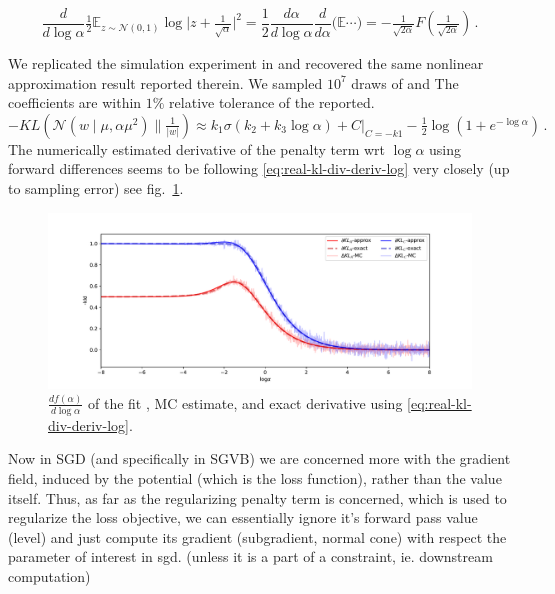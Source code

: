 \documentclass[a4paper,10pt]{article}
\begin{document}
\begin{equation} \label{eq:real-kl-div-deriv-log}
  \frac{d}{d\log \alpha}
    \tfrac12 \mathbb{E}_{z \sim \mathcal{N}(0,1)}
    \log \lvert z + \tfrac1{\sqrt{\alpha}} \rvert^2
    = \frac12 \frac{d\alpha}{d\log \alpha}
      \frac{d}{d\alpha} \bigl(\mathbb{E}\cdots \bigr)
    = - \tfrac1{\sqrt{2\alpha}} F(\tfrac1{\sqrt{2\alpha}})
    \,.
\end{equation}

We replicated the simulation experiment in \cite{molchanov_variational_2017} and recovered
the same nonlinear approximation result reported therein. We sampled $10^7$ draws of  and 
The coefficients are within
$1\%$ relative tolerance of the reported.
$$
- KL(\mathcal{N}(w \mid \mu, \alpha \mu^2) \|
    \tfrac1{\lvert w \rvert})
  \approx
    k_1 \sigma(k_2 + k_3 \log \alpha) + C \big\vert_{C = -k1}
    - \tfrac12 \log (1 + e^{-\log \alpha})
  \,. $$
The numerically estimated derivative of the penalty term wrt $\log \alpha$ using forward
differences seems to be following \eqref{eq:real-kl-div-deriv-log} very closely (up to
sampling error) see fig.~\ref{fig:molchanov-derivative-replica}.

\begin{figure}[!ht]
  \centering
  \includegraphics[width=1.\linewidth]{../notebooks/assets/grad_log.pdf}
  \caption{$\tfrac{d f(\alpha)}{d \log{\alpha}}$ of the fit \cite{molchanov_variational_2017},
  MC estimate, and exact derivative using \eqref{eq:real-kl-div-deriv-log}.}
  \label{fig:molchanov-derivative-replica}
\end{figure}

Now in SGD (and specifically in SGVB) we are concerned more with the gradient field, induced
by the potential (which is the loss function), rather than the value itself. Thus, as far as
the regularizing penalty term is concerned, which is used to regularize the loss objective,
we can essentially ignore it's forward pass value (level) and just compute its gradient
(subgradient, normal cone) with respect the parameter of interest in sgd. (unless it is a
part of a constraint, ie. downstream computation)
\end{document}
